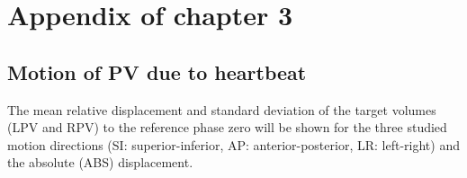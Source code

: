 
\chapter{Appendix of chapter 3}
\label{app:human}

\section{Motion of PV due to heartbeat}
\label{app:human:motion}

The mean relative displacement and standard deviation of the target volumes (LPV and RPV) to the reference phase zero will be shown for the three studied motion 
directions (SI: superior-inferior, AP: anterior-posterior, LR: left-right) and the absolute (ABS) displacement. 

